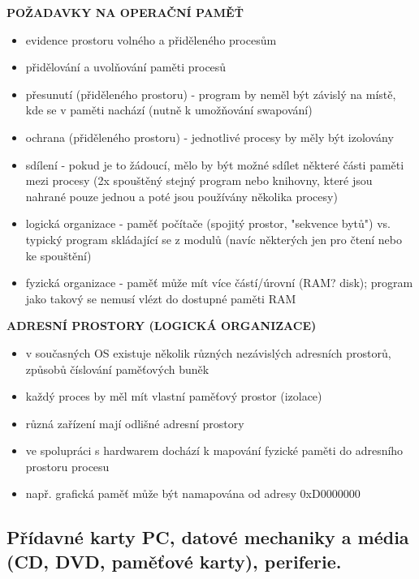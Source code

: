 \documentclass[10pt,a4paper]{article}
\begin{document}
\textbf{POŽADAVKY NA OPERAČNÍ PAMĚŤ}
\begin{itemize}
	\item evidence prostoru volného a přiděleného procesům
	\item přidělování a uvolňování paměti procesů
	\item přesunutí (přiděleného prostoru) - program by neměl být závislý na místě, kde se v paměti
nachází (nutně k umožňování swapování)
	\item ochrana (přiděleného prostoru) - jednotlivé procesy by měly být izolovány
	\item sdílení - pokud je to žádoucí, mělo by být možné sdílet některé části paměti mezi procesy
(2x spouštěný stejný program nebo knihovny, které jsou nahrané pouze jednou a poté jsou
používány několika procesy)
	\item logická organizace - paměť počítače (spojitý prostor, "sekvence bytů") vs. typický program
skládající se z modulů (navíc některých jen pro čtení nebo ke spouštění)
	\item fyzická organizace - paměť může mít více částí/úrovní (RAM? disk); program jako takový
se nemusí vlézt do dostupné paměti RAM
\end{itemize}

\textbf{ADRESNÍ PROSTORY (LOGICKÁ ORGANIZACE)}
\begin{itemize}
	\item v současných OS existuje několik různých nezávislých adresních prostorů, způsobů číslování
paměťových buněk
	\item každý proces by měl mít vlastní paměťový prostor (izolace)
	\item různá zařízení mají odlišné adresní prostory
	\item ve spolupráci s hardwarem dochází k mapování fyzické paměti do adresního prostoru procesu
	\item např. grafická paměť může být namapována od adresy 0xD0000000
\end{itemize}

\subsection{Přídavné karty PC, datové mechaniky a média (CD, DVD, paměťové karty), periferie.}


\newpage
\section{}
\end{document}
